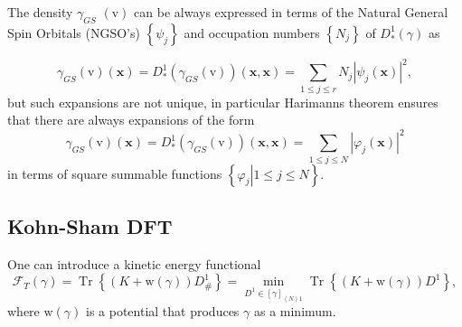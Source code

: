 \documentclass[aps,preprint]{revtex4}%
\begin{document}
The density $\gamma_{GS}$ $\left(  \mathrm{v}\right)  $ can be always
expressed in terms of the Natural General Spin Orbitals (NGSO's) $\left\{
\psi_{j}\right\}  $ and occupation numbers $\left\{  N_{j}\right\}  $ of
$D_{\ast}^{1}\left(  \gamma\right)  $ as%

\begin{equation}
\gamma_{GS}\left(  \mathrm{v}\right)  \left(  \mathbf{x}\right)  =D_{\ast}%
^{1}\left(  \gamma_{GS}\left(  \mathrm{v}\right)  \right)  \left(
\mathbf{x,x}\right)  =\sum_{1\leq j\leq r}N_{j}\left\vert \psi_{j}\left(
\mathbf{x}\right)  \right\vert ^{2},
\end{equation}
but such expansions are not unique, in particular Harimanns \cite{Harimann}
theorem ensures that there are always expansions of the form
\begin{equation}
\gamma_{GS}\left(  \mathrm{v}\right)  \left(  \mathbf{x}\right)  =D_{\ast}%
^{1}\left(  \gamma_{GS}\left(  \mathrm{v}\right)  \right)  \left(
\mathbf{x,x}\right)  =\sum_{1\leq j\leq N}\left\vert \varphi_{j}\left(
\mathbf{x}\right)  \right\vert ^{2}%
\end{equation}
in terms of square summable functions $\left\{  \left.  \varphi_{j}\right\vert
1\leq j\leq N\right\}  $.

\subsection{Kohn-Sham DFT}

\bigskip One can introduce a kinetic energy functional
\begin{equation}
\mathcal{F}_{T}\left(  \gamma\right)  =\operatorname{Tr}\left\{  \left(
K+\mathrm{w}\left(  \gamma\right)  \right)  D_{\#}^{1}\right\}  =\min
_{D^{1}\in\left[  \gamma\right]  _{\left\langle N\right\rangle 1}%
}\operatorname{Tr}\left\{  \left(  K+\mathrm{w}\left(  \gamma\right)  \right)
D^{1}\right\}  , \label{KEFunc}%
\end{equation}
where $\mathrm{w}\left(  \gamma\right)  $ is a potential that produces
$\gamma$ as a minimum.
\end{document}
